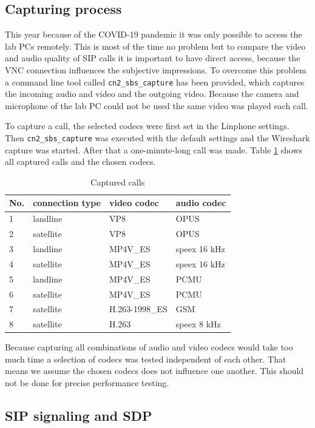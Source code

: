 \documentclass[parskip=full]{scrartcl}
\begin{document}
\subsection{Capturing process} \label{subsec:capture}
This year because of the COVID-19 pandemic it was only possible to access the lab PCs remotely.
This is most of the time no problem but to compare the video and audio quality of SIP calls it is important to have direct access, because the VNC connection influences the subjective impressions.
To overcome this problem a command line tool called \verb|cn2_sbs_capture| has been provided, which captures the incoming audio and video and the outgoing video.
Because the camera and microphone of the lab PC could not be used the same video was played each call.

To capture a call, the selected codecs were first set in the Linphone settings. 
Then \verb|cn2_sbs_capture| was executed with the default settings and the Wireshark capture was started. 
After that a one-minute-long call was made. 
Table \ref{tab:capture} shows all captured calls and the chosen codecs.

\begin{table}[hb]
	\centering
	\caption{Captured calls}
	\label{tab:capture}
	\begin{tabular}{l|l|l|l}
		\toprule
		\textbf{No.} & \textbf{connection type} & \textbf{video codec} & \textbf{audio codec}  \\ \midrule
		1 & landline & VP8 & OPUS\\
		2 & satellite & VP8 & OPUS\\
		3 & landline & MP4V\_ES & speex 16 kHz\\
		4 & satellite & MP4V\_ES & speex 16 kHz\\
		5 & landline & MP4V\_ES & PCMU\\
		6 & satellite & MP4V\_ES & PCMU\\
		7 & satellite & H.263-1998\_ES & GSM\\
		8 & satellite & H.263 & speex 8 kHz\\
		\bottomrule
	\end{tabular}
\end{table}

Because capturing all combinations of audio and video codecs would take too much time a selection of codecs was tested independent of each other.
That means we assume the chosen codecs does not influence one another.
This should not be done for precise performance testing.

\subsection{SIP signaling and SDP} \label{subsec:signaling}
\end{document}
